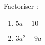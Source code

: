 
\begin{mental}
    Factoriser :
    \begin{enumerate}
        \item
            \( 5a+10\)
        \item
            \( 3a^2+9a\)
    \end{enumerate}
\end{mental}
